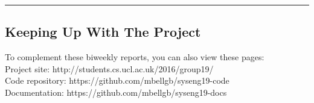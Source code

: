 \documentclass[11pt]{report}
\begin{document}
\hrule

\subsection*{Keeping Up With The Project}

To complement these biweekly reports, you can also view these pages:\\

\noindent
Project site: http://students.cs.ucl.ac.uk/2016/group19/\\

\noindent
Code repository: https://github.com/mbellgb/syseng19-code\\

\noindent
Documentation: https://github.com/mbellgb/syseng19-docs
\end{document}
